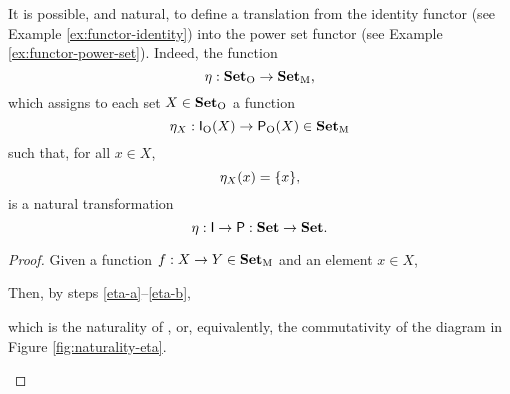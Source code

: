 \begin{example}
  \label{ex:natural-identity-power-set}


  It is possible, and natural, to define a translation from the
  identity functor (see Example \ref{ex:functor-identity}) into the power
  set functor (see Example \ref{ex:functor-power-set}). Indeed, the
  function
  \begin{equation*}
    \eta: \mathcal{\mathbf{Set}}_{\operatorname{O}} \to \mathcal{\mathbf{Set}}_{\operatorname{M}}
    \text{,}
  \end{equation*}
  which assigns to each set $X \in \mathcal{\mathbf{Set}}_{\operatorname{O}}$ a function
  \begin{equation*}
    \eta_{X}: \mathsf{I}_{\operatorname{O}}(X) \to \mathsf{P}_{\operatorname{O}}(X) \in \mathcal{\mathbf{Set}}_{\operatorname{M}}
  \end{equation*}
  such that, for all $x \in X$,
  \begin{equation}
    \label{eq:eta}
    \eta_{X}(x) = \{x\}
    \text{,}
  \end{equation}
  is a natural transformation
  \begin{equation*}
    \eta: \mathsf{I} \to \mathsf{P}: \mathbf{Set} \to \mathbf{Set}
    \text{.}
  \end{equation*}
  \begin{proof}
    Given a function $f: X \to Y \in \mathcal{\mathbf{Set}}_{\operatorname{M}}$ and an element $x
    \in X$,
    \begin{steps}
      \label{eta-a}
        \eqbydef{\comp}
        \eqbydef{\nat{\eta} \eqref{eq:eta}}
        \eqbydef{\nat{\eta} \eqref{eq:eta}}
        \eqbydef{\comp}
      \label{eta-b}
    \end{steps}
    Then, by steps \ref{eta-a}--\ref{eta-b},
    \begin{steps}[resume]
    \end{steps}
    which is the naturality of \nat{\eta}, or, equivalently, the
    commutativity of the diagram in Figure \ref{fig:naturality-eta}.
    \begin{figure}[htbp]
      \begin{center}
\end{center}
\end{figure}
\end{proof}
\end{example}
